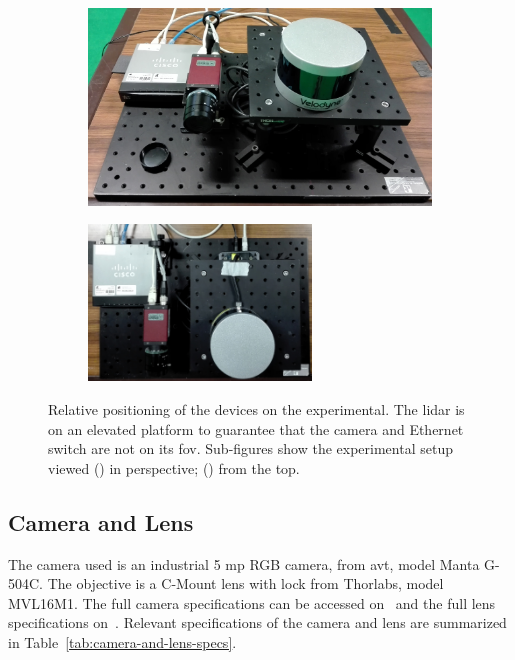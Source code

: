 \begin{figure}[!ht]
	\centering
	\begin{subfigure}[c]{0.45\textwidth}
		\includegraphics[width=\textwidth]{img/experimental-setup/table-setup-cambada-perspective.jpg}
		\caption{}
		\label{fig:experimental-setup:perspective}
	\end{subfigure}
	\qquad
	\begin{subfigure}[c]{0.45\textwidth}
		\includegraphics[width=0.65\textwidth, keepaspectratio, angle=90]{img/experimental-setup/table-setup-cambada-birds-eye.jpg}
		\caption{}
		\label{fig:experimental-setup:birds-eye}
	\end{subfigure}
	\caption[Perspective and top views of the experimental setup for the camera and \acs{lidar}.]{Relative positioning of the devices on the experimental. The \ac{lidar} is on an elevated platform to guarantee that the camera and Ethernet switch are not on its \ac{fov}. Sub-figures show the experimental setup viewed () in perspective; () from the top.}
	\label{fig:experimental-setup}
\end{figure}

\subsection{Camera and Lens}
The camera used is an industrial 5 \ac{mp} RGB camera, from \acf{avt}, model Manta G-504C. The objective is a C-Mount lens with lock from Thorlabs\cp, model MVL16M1. The full camera specifications can be accessed on~\cite{MantaG504C} and the full lens specifications on~\cite{Thorlabs}. Relevant specifications of the camera and lens are summarized in Table~\ref{tab:camera-and-lens-specs}. 

